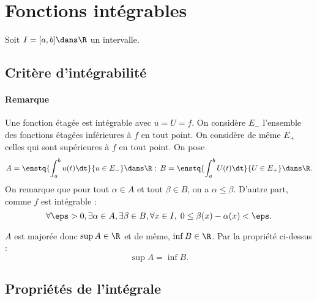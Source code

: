 \documentclass{livre}
\begin{document}
\section{Fonctions intégrables}


Soit $I = [a,b]\dans \R$ un intervalle.

\subsection{Critère d'intégrabilité}


\paragraph{Remarque}Une fonction étagée est intégrable avec $u=U=f$.
\bigbreak
On considère $E_-$ l'ensemble des fonctions étagées inférieures à $f$ en tout point. On considère de même $E_+$ celles qui sont supérieures à $f$ en tout point. On pose \[ A =\enstq{\int_{a}^{b}u(t)\dt}{u\in E_-} \dans \R\; ; \; B = \enstq{\int_{a}^{b}U(t)\dt}{U\in E_+}\dans \R. \]On remarque que pour tout $\alpha\in A$ et tout $\beta\in B$, on a $\alpha\leq\beta$. D'autre part, comme $f$ est intégrable : \[ \forall\eps>0,\exists\alpha\in A,\exists\beta\in B,\forall x\in I,\; 0\leq \beta(x)-\alpha(x)<\eps.\]

$A$ est majorée donc $\sup A\in\R$ et de même, $\inf B\in \R$. Par la propriété ci-dessus : \[ \sup A = \inf B .\]


\subsection{Propriétés de l'intégrale}
\end{document}
